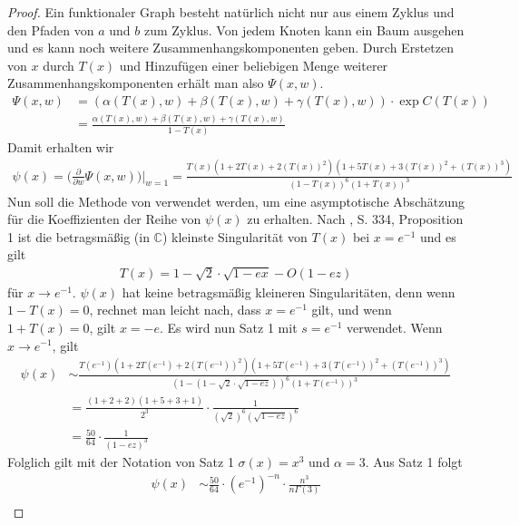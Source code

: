 \documentclass[a4paper, 10pt, ngerman]{article}
\newcommand{\C}{\mathbb{C}}
\begin{document}
\begin{proof}
    Ein funktionaler Graph besteht natürlich nicht nur aus einem Zyklus und den Pfaden von $a$ und $b$ zum Zyklus. Von jedem Knoten kann ein Baum ausgehen und es kann noch weitere Zusammenhangskomponenten geben. Durch Erstetzen von $x$ durch $T(x)$ und Hinzufügen einer beliebigen Menge weiterer Zusammenhangskomponenten erhält man also $\Psi(x, w)$.
    \begin{align*}
        \Psi(x, w)
         & = (\alpha(T(x), w) + \beta(T(x), w) + \gamma(T(x), w)) \cdot \exp C(T(x)) \\
         & = \frac {\alpha(T(x), w) + \beta(T(x), w) + \gamma(T(x), w)} {1 - T(x)}
    \end{align*}
    Damit erhalten wir
    \begin{align*}
        \psi(x) = \Bigg (\frac {\partial} {\partial w} \Psi(x, w) \Bigg ) \Bigg \vert_{w = 1} = \frac {T(x)(1 + 2T(x) + 2(T(x))^2)(1 + 5T(x) + 3(T(x))^2 + (T(x))^3)} {(1 - T(x))^6(1 + T(x))^3}
    \end{align*}
    Nun soll die Methode von \cite{fo90} verwendet werden, um eine asymptotische Abschätzung für die Koeffizienten der Reihe von $\psi(x)$ zu erhalten. Nach \cite{fo90}, S. 334, Proposition 1 ist die betragsmäßig (in $\C$) kleinste Singularität von $T(x)$ bei $x = e^{-1}$ und es gilt
    \begin{align*}
        T(x) = 1 - \sqrt{2}\cdot \sqrt {1 - ex} - O(1 - ez)
    \end{align*}
    für $x \to e^{-1}$. $\psi(x)$ hat keine betragsmäßig kleineren Singularitäten, denn wenn $1 - T(x) = 0$, rechnet man leicht nach, dass $x = e^{-1}$ gilt, und wenn $1 + T(x) = 0$, gilt $x = -e$. Es wird nun Satz 1 mit $s = e^{-1}$ verwendet. Wenn $x \to e^{-1}$, gilt
    \begin{align*}
        \psi(x)
         & \sim \frac {T(e^{-1})(1 + 2T(e^{-1}) + 2(T(e^{-1}))^2)(1 + 5T(e^{-1}) + 3(T(e^{-1}))^2 + (T(e^{-1}))^3)} {(1 - (1 - \sqrt 2 \cdot \sqrt {1 - ez}))^6(1 + T(e^{-1}))^3} \\
         & = \frac {(1 + 2 + 2)(1 + 5 + 3 + 1)} {2^3} \cdot \frac 1 {(\sqrt 2)^6 (\sqrt{1 - ez})^6}                                                                               \\
         & = \frac {50} {64} \cdot \frac 1 {(1 - ez)^3}
    \end{align*}
    Folglich gilt mit der Notation von Satz 1 $\sigma(x) = x^3$ und $\alpha = 3$. Aus Satz 1 folgt
    \begin{align*}
        [x^n] \psi(x)
         & \sim \frac {50} {64} \cdot (e^{-1})^{-n} \cdot \frac {n^3} {n \Gamma(3)} \\

\end{align*}
\end{proof}
\end{document}
